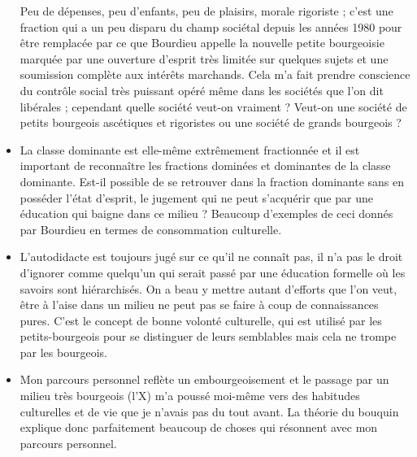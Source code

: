 \begin{itemize}
  Peu de dépenses, peu d'enfants, peu de plaisirs, morale rigoriste ; c'est une fraction qui a un peu disparu du champ sociétal depuis les années 1980 pour être remplacée par ce que Bourdieu appelle la nouvelle petite bourgeoisie marquée par une ouverture d'esprit très limitée sur quelques sujets et une soumission complète aux intérêts marchands.
  Cela m'a fait prendre conscience du contrôle social très puissant opéré même dans les sociétés que l'on dit libérales ;
  cependant quelle société veut-on vraiment ?
  Veut-on une société de petits bourgeois ascétiques et rigoristes ou une société de grands bourgeois ?
  \item La classe dominante est elle-même extrêmement fractionnée et il est important de reconnaître les fractions dominées et dominantes de la classe dominante.
  Est-il possible de se retrouver dans la fraction dominante sans en posséder l'état d'esprit, le jugement qui ne peut s'acquérir que par une  éducation qui baigne dans ce milieu ?
  Beaucoup d'exemples de ceci donnés par Bourdieu en termes de consommation culturelle.
  \item L'autodidacte est toujours jugé sur ce qu'il ne connaît pas, il n'a pas le droit d'ignorer comme quelqu'un qui serait passé par une éducation formelle où les savoirs sont hiérarchisés.
  On a beau y mettre autant d'efforts que l'on veut, être à l'aise dans un milieu ne peut pas se faire à coup de connaissances pures.
  C'est le concept de bonne volonté culturelle, qui est utilisé par les petits-bourgeois pour se distinguer de leurs semblables mais cela ne  trompe par les bourgeois.
  \item Mon parcours personnel reflète un embourgeoisement et le passage par un milieu très bourgeois (l'X) m'a poussé moi-même vers des habitudes culturelles et de vie que je n'avais pas du tout avant.
  La théorie du bouquin explique donc parfaitement beaucoup de choses qui résonnent avec mon parcours personnel.
\end{itemize}
